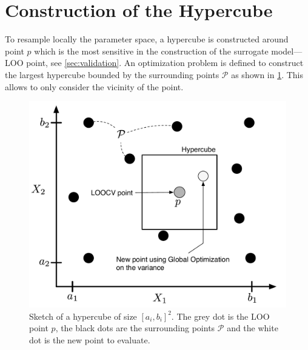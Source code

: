 \section{Construction of the Hypercube}
\label{sec:hypercube}

To resample locally the parameter space, a hypercube is constructed around point $p$ which is the most sensitive in the construction of the surrogate model---LOO point, see \cref{sec:validation}. An optimization problem is defined to construct the largest hypercube bounded by the surrounding points $\mathcal{P}$ as shown in \cref{fig:hypercube}. This allows to only consider the vicinity of the point.

\begin{figure}[ht]
\centering
\includegraphics[width=0.8\linewidth,keepaspectratio]{fig/contributions/resample/2_1column_color-online-only_hypercube.pdf}
\caption{Sketch of a hypercube of size $[a_i, b_i]^2$. The grey dot is the LOO point $p$, the black dots are the surrounding points $\mathcal{P}$ and the white dot is the new point to evaluate.}
\label{fig:hypercube}
\end{figure}

